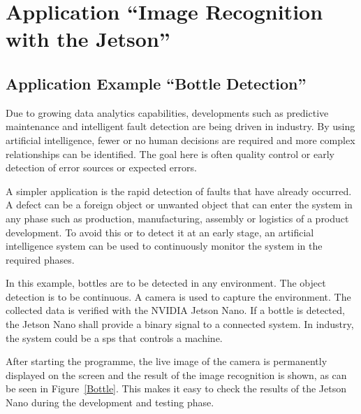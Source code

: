 %
%


\chapter{Application ``Image Recognition with the Jetson''}


\section{Application Example ``Bottle Detection''}

Due to growing data analytics capabilities, developments such as predictive maintenance and intelligent fault detection are being driven in industry. By using artificial intelligence, fewer or no human decisions are required and more complex relationships can be identified. The goal here is often quality control or early detection of error sources or expected errors. 

\bigskip  

A simpler application is the rapid detection of faults that have already occurred. A defect can be a foreign object or unwanted object that can enter the system in any phase such as production, manufacturing, assembly or logistics of a product development. To avoid this or to detect it at an early stage, an artificial intelligence system can be used to continuously monitor the system in the required phases. 

\bigskip

In this example, bottles are to be detected in any environment. The object detection is to be continuous. A camera is used to capture the environment. The collected data is verified with the NVIDIA Jetson Nano. If a bottle is detected, the Jetson Nano shall provide a binary signal to a connected system. In industry, the system could be a \ac{sps} that controls a machine. 

\bigskip

After starting the programme, the live image of the camera is permanently displayed on the screen and the result of the image recognition is shown, as can be seen in Figure~\ref{Bottle}. This makes it easy to check the results of the Jetson Nano during the development and testing phase.

